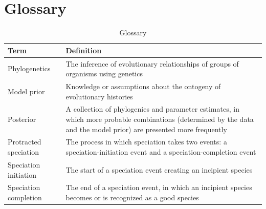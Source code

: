 \documentclass{article}
\begin{document}
\section{Glossary}
\begin{table}
  \centering 
  \begin{tabular}{l p{}}
    \hline
    Term                  & Definition \\
    \hline
    \hline
    Phylogenetics         & The inference of evolutionary relationships of groups of organisms using genetics \\
    Model prior           & Knowledge or assumptions about the ontogeny of evolutionary histories \\
    Posterior             & A collection of phylogenies and parameter estimates, in which more probable combinations (determined by the data and the model prior) are presented more frequently \\
    Protracted speciation & The process in which speciation takes two events: a speciation-initiation event and a speciation-completion event  \\
    Speciation initiation & The start of a speciation event creating an incipient species \\
    Speciation completion & The end of a speciation event, in which an incipient species becomes or is recognized as a good species \\
    \hline
  \end{tabular}
  \caption{
    Glossary
  }
  \label{table:glossary}
\end{table}




\appendix
\end{document}
